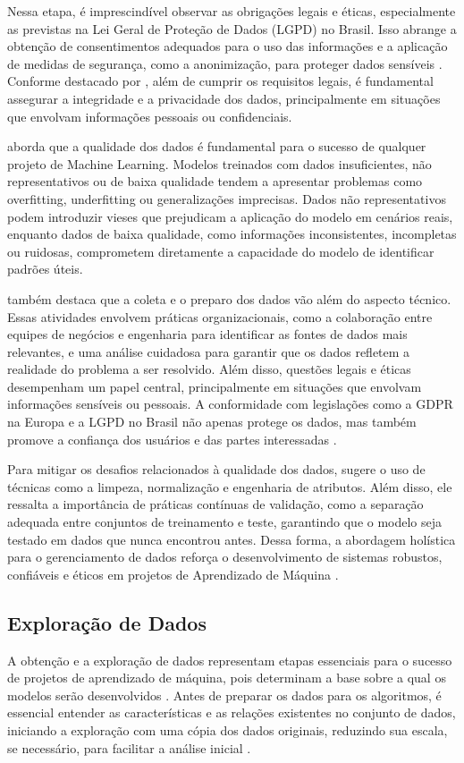 Nessa etapa, é imprescindível observar as obrigações legais e éticas, especialmente as previstas na Lei Geral de Proteção de Dados (LGPD) no Brasil. Isso abrange a obtenção de consentimentos adequados para o uso das informações e a aplicação de medidas de segurança, como a anonimização, para proteger dados sensíveis \cite{muller2017}. Conforme destacado por , além de cumprir os requisitos legais, é fundamental assegurar a integridade e a privacidade dos dados, principalmente em situações que envolvam informações pessoais ou confidenciais.

 aborda que a qualidade dos dados é fundamental para o sucesso de qualquer projeto de Machine Learning. Modelos treinados com dados insuficientes, não representativos ou de baixa qualidade tendem a apresentar problemas como overfitting, underfitting ou generalizações imprecisas. Dados não representativos podem introduzir vieses que prejudicam a aplicação do modelo em cenários reais, enquanto dados de baixa qualidade, como informações inconsistentes, incompletas ou ruidosas, comprometem diretamente a capacidade do modelo de identificar padrões úteis.

 também destaca que a coleta e o preparo dos dados vão além do aspecto técnico. Essas atividades envolvem práticas organizacionais, como a colaboração entre equipes de negócios e engenharia para identificar as fontes de dados mais relevantes, e uma análise cuidadosa para garantir que os dados refletem a realidade do problema a ser resolvido. Além disso, questões legais e éticas desempenham um papel central, principalmente em situações que envolvam informações sensíveis ou pessoais. A conformidade com legislações como a GDPR na Europa e a LGPD no Brasil não apenas protege os dados, mas também promove a confiança dos usuários e das partes interessadas \cite{geron2017}.

Para mitigar os desafios relacionados à qualidade dos dados,  sugere o uso de técnicas como a limpeza, normalização e engenharia de atributos. Além disso, ele ressalta a importância de práticas contínuas de validação, como a separação adequada entre conjuntos de treinamento e teste, garantindo que o modelo seja testado em dados que nunca encontrou antes. Dessa forma, a abordagem holística para o gerenciamento de dados reforça o desenvolvimento de sistemas robustos, confiáveis e éticos em projetos de Aprendizado de Máquina \cite{geron2017}.

\subsection{Exploração de Dados}
A obtenção e a exploração de dados representam etapas essenciais para o sucesso de projetos de aprendizado de máquina, pois determinam a base sobre a qual os modelos serão desenvolvidos \cite{geron2017}. Antes de preparar os dados para os algoritmos, é essencial entender as características e as relações existentes no conjunto de dados, iniciando a exploração com uma cópia dos dados originais, reduzindo sua escala, se necessário, para facilitar a análise inicial \cite{geron2017}.

